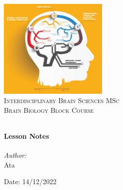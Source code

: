 
\begin{titlepage}
\vbox{ }
\vbox{ }
\begin{center}
\includegraphics[width=0.40\textwidth]{Images/IDB Logo.jpg}\\[1cm]
\textsc{\LARGE Interdisciplinary Brain Sciences MSc}\\[1.5cm]
\textsc{\Large Brain Biology Block Course}\\[0.5cm]
\vbox{ }

\HRule \\[0.4cm]
{ \huge \bfseries Lesson Notes}\\[0.4cm]
\HRule \\[1.5cm]

\large
\emph{Author:}\\
Ata
\vfill

{\large Date: 14/12/2022}
\end{center}
\end{titlepage}